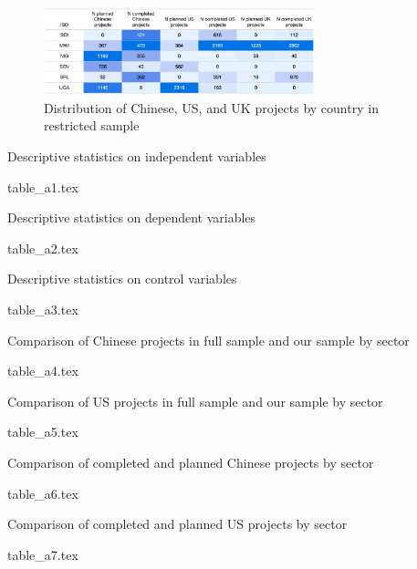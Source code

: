 \documentclass[9pt]{article}
\begin{document}
\begin{figure}[H]
\centering
\includegraphics[width=0.7\textwidth]{figures/figure_a3.png}
\caption{Distribution of Chinese, US, and UK projects by country in restricted sample}
\end{figure}

\setlength{\tabcolsep}{5pt}
\begin{table}[H]
\caption{Descriptive statistics on independent variables}
\label{reg}
\centering
{table_a1.tex}
\end{table}

\setlength{\tabcolsep}{5pt}
\begin{table}[H]
\caption{Descriptive statistics on dependent variables}
\label{reg}
\centering
{table_a2.tex}
\end{table}

\setlength{\tabcolsep}{5pt}
\begin{table}[H]
\caption{Descriptive statistics on control variables}
\label{reg}
\centering
{table_a3.tex}
\end{table}

\setlength{\tabcolsep}{5pt}
\begin{table}[H]
\caption{Comparison of Chinese projects in full sample and our sample by sector}
\label{reg}
\centering
{table_a4.tex}
\end{table}

\setlength{\tabcolsep}{5pt}
\begin{table}[H]
\caption{Comparison of US projects in full sample and our sample by sector}
\label{reg}
\centering
{table_a5.tex}
\end{table}

\setlength{\tabcolsep}{5pt}
\begin{table}[H]
\caption{Comparison of completed and planned Chinese projects by sector}
\label{reg}
\centering
{table_a6.tex}
\end{table}

\setlength{\tabcolsep}{5pt}
\begin{table}[H]
\caption{Comparison of completed and planned US projects by sector}
\label{reg}
\centering
{table_a7.tex}
\end{table}
\end{document}

